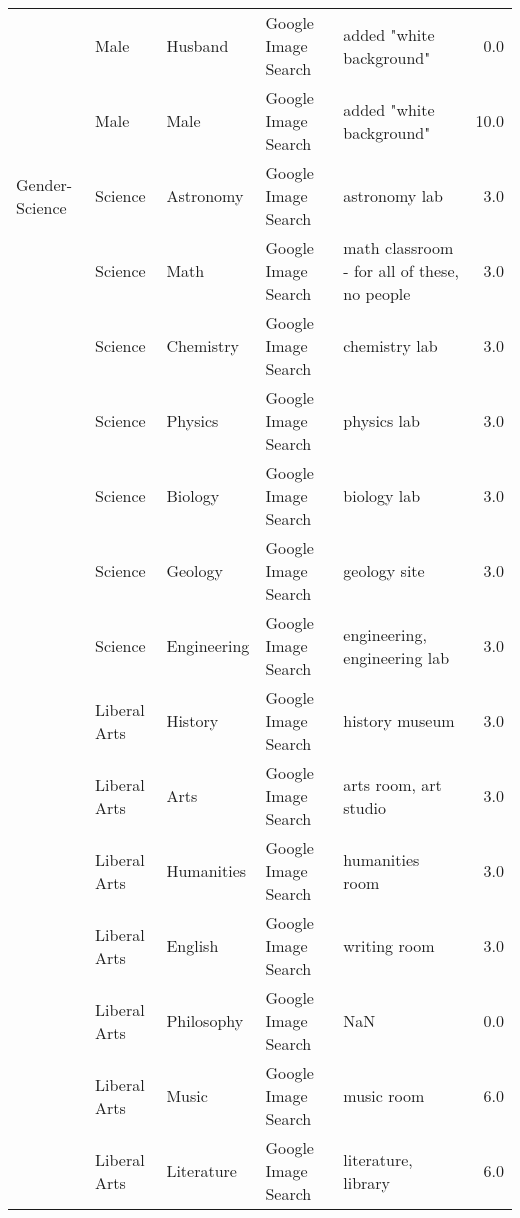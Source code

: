 \begin{tabular}{lllllr}
          & Male &          Husband &  Google Image Search &                           added "white background" &   0.0 \\
          & Male &             Male &  Google Image Search &                           added "white background" &  10.0 \\
Gender-Science & Science &        Astronomy &  Google Image Search &                                      astronomy lab &   3.0 \\
          & Science &             Math &  Google Image Search &       math classroom - for all of these, no people &   3.0 \\
          & Science &        Chemistry &  Google Image Search &                                      chemistry lab &   3.0 \\
          & Science &          Physics &  Google Image Search &                                        physics lab &   3.0 \\
          & Science &          Biology &  Google Image Search &                                        biology lab &   3.0 \\
          & Science &          Geology &  Google Image Search &                                       geology site &   3.0 \\
          & Science &      Engineering &  Google Image Search &                       engineering, engineering lab &   3.0 \\
          & Liberal Arts &          History &  Google Image Search &                                     history museum &   3.0 \\
          & Liberal Arts &             Arts &  Google Image Search &                              arts room, art studio &   3.0 \\
          & Liberal Arts &       Humanities &  Google Image Search &                                    humanities room &   3.0 \\
          & Liberal Arts &          English &  Google Image Search &                                       writing room &   3.0 \\
          & Liberal Arts &       Philosophy &  Google Image Search &                                                NaN &   0.0 \\
          & Liberal Arts &            Music &  Google Image Search &                                         music room &   6.0 \\
          & Liberal Arts &       Literature &  Google Image Search &                                literature, library &   6.0 \\

\end{tabular}
